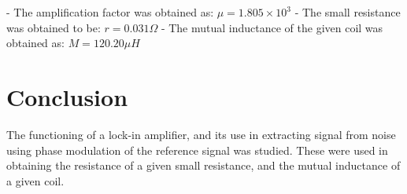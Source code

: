 \documentclass{ieeeconf}
\begin{document}
- The amplification factor was obtained as: $\mu = 1.805 \times 10^3$
- The small resistance was obtained to be: $r =0.031\Omega$
- The mutual inductance of the given coil was obtained as: $M = 120.20 \mu H$

\section{Conclusion}

The functioning of a lock-in amplifier, and its use in extracting signal from noise using phase modulation of the reference signal was studied. These were used in obtaining the resistance of a given small resistance, and the mutual inductance of a given coil.





\clearpage
\end{document}
